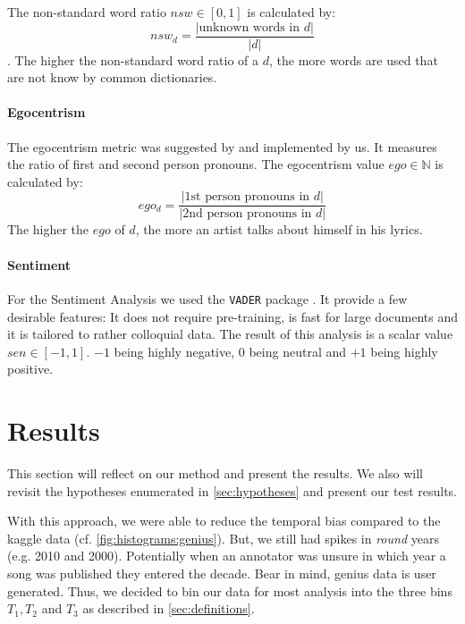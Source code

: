 \documentclass[11pt,a4paper]{article}
\begin{document}
The non-standard word ratio $nsw \in [0,1]$ is calculated by:
\begin{equation}
	nsw_{d} = \frac{|\text{unknown words in }d|}{|d|}
\end{equation}
. The higher the non-standard word ratio of a $d$, the more words are used that are not know by common dictionaries. 

\paragraph{Egocentrism}

The egocentrism metric was suggested by \citet{DBLP:conf/coling/FellS14} and implemented by us. It measures the ratio of first and second person pronouns. The egocentrism value $ego \in \mathbb{N}$ is calculated by:
\begin{equation}
	ego_{d} = \frac{|\text{1st person pronouns in }d|}{|\text{2nd person pronouns in }d|}
\end{equation} 
The higher the $ego$ of $d$, the more an artist talks about himself in his lyrics.

\paragraph{Sentiment}

For the Sentiment Analysis we used the \texttt{VADER} package \citep{hutto2014vader}. It provide a few desirable features: It does not require pre-training, is fast for large documents and it is tailored to rather colloquial data. The result of this analysis is a scalar value $sen \in [-1,1]$. $-1$ being highly negative, $0$ being neutral and $+1$ being highly positive. 


\section{Results}\label{sec:results}

This section will reflect on our method and present the results. We also will revisit the hypotheses enumerated in \cref{sec:hypotheses} and present our test results. 

With this approach, we were able to reduce the temporal bias compared to the kaggle data (cf. \cref{fig:histograms:genius}). But, we still had spikes in \emph{round} years (e.g. 2010 and 2000). Potentially when an annotator was unsure in which year a song was published they entered the decade. Bear in mind, genius data is user generated. Thus, we decided to bin our data for most analysis into the three bins $T_1, T_2$ and $T_3$ as described in \cref{sec:definitions}.
\end{document}
